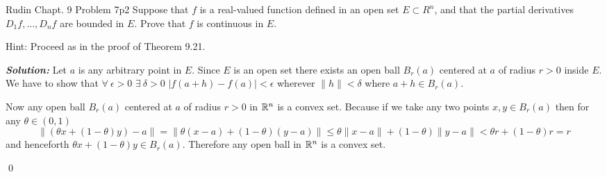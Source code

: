 \documentclass[a4paper, 11pt]{article}
\newcommand{\Qed}{\begin{flushright}\qed\end{flushright}}
\newcommand{\sol}[1]{\begin{solution}#1\end{solution}\Qed}
\newcommand{\parinn}{\setlength{\parindent}{1cm}}
\newenvironment{solution}
{\textbf{\textit{Solution: }}\setlength{\parindent}{1cm}}
{}
\begin{document}
	
	
	\begin{problem}{Rudin Chapt. 9 Problem 7}{p2%
		}
		Suppose that $f$ is a real-valued function defined in an open set $E \subset R^{n}$, and that the partial derivatives $D_{1} f, \ldots, D_{n} f$ are bounded in $E$. Prove that $f$ is continuous in $E$.\parinn
		
		Hint: Proceed as in the proof of Theorem 9.21.
	\end{problem}
	
	\sol{Let $a$ is any arbitrary point in $E$. Since $E$ is an open set there exists an open ball $B_r(a)$ centered at $a$ of radius $r>0$ inside $E$. We have to show that $\forall\ \epsilon>0$ $\exists \ \delta>0$ $|f(a+h)-f(a)|<\epsilon$ wherever $\|h\|<\delta$ where $a+h\in B_r(a)$. 
		
		Now any open ball $B_r(a)$ centered at $a$ of radius $r>0$ in $\mathbb{R}^n$ is a convex set. Because if we take any two points $x,y\in B_r(a)$ then for any $\theta\in (0,1)$ $$\|(\theta x+(1-\theta) y)-a\|=\|\theta (x-a)+(1-\theta)(y-a)\|\leq \theta\|x-a\|+(1-\theta)\|y-a\|< \theta r+(1-\theta )r=r$$and henceforth $\theta x+(1-\theta)y\in B_r(a)$. Therefore any open ball in $\mathbb{R}^n$ is a convex set.
		
}
\end{document}
